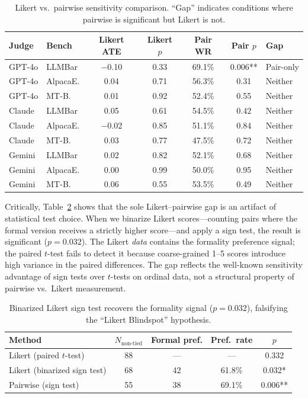 \documentclass[11pt,a4paper]{article}
\begin{document}
\begin{table}[t]
\centering
\small
\caption{Likert vs.\ pairwise sensitivity comparison. ``Gap'' indicates conditions where pairwise is significant but Likert is not.}
\label{tab:likert_pairwise}
\begin{tabular}{llccccl}
\toprule
\textbf{Judge} & \textbf{Bench} & \textbf{Likert ATE} & \textbf{Likert $p$} & \textbf{Pair WR} & \textbf{Pair $p$} & \textbf{Gap} \\
\midrule
GPT-4o & LLMBar & $-$0.10 & 0.33 & 69.1\% & 0.006** & Pair-only \\
GPT-4o & AlpacaE. & 0.04 & 0.71 & 56.3\% & 0.31 & Neither \\
GPT-4o & MT-B. & 0.01 & 0.92 & 52.4\% & 0.55 & Neither \\
Claude & LLMBar & 0.05 & 0.61 & 54.5\% & 0.42 & Neither \\
Claude & AlpacaE. & $-$0.02 & 0.85 & 51.1\% & 0.84 & Neither \\
Claude & MT-B. & 0.03 & 0.77 & 47.5\% & 0.72 & Neither \\
Gemini & LLMBar & 0.02 & 0.82 & 52.1\% & 0.68 & Neither \\
Gemini & AlpacaE. & 0.00 & 0.99 & 50.0\% & 0.95 & Neither \\
Gemini & MT-B. & 0.06 & 0.55 & 53.5\% & 0.49 & Neither \\
\bottomrule
\end{tabular}
\end{table}

Critically, Table~\ref{tab:binarized} shows that the sole Likert--pairwise gap is an artifact of statistical test choice. When we binarize Likert scores---counting pairs where the formal version receives a strictly higher score---and apply a sign test, the result is significant ($p=0.032$). The Likert \emph{data} contains the formality preference signal; the paired $t$-test fails to detect it because coarse-grained 1--5 scores introduce high variance in the paired differences. The gap reflects the well-known sensitivity advantage of sign tests over $t$-tests on ordinal data, not a structural property of pairwise vs.\ Likert measurement.

\begin{table}[t]
\centering
\small
\caption{Binarized Likert sign test recovers the formality signal ($p=0.032$), falsifying the ``Likert Blindspot'' hypothesis.}
\label{tab:binarized}
\begin{tabular}{lcccc}
\toprule
\textbf{Method} & \textbf{$N_{\text{non-tied}}$} & \textbf{Formal pref.} & \textbf{Pref.\ rate} & \textbf{$p$} \\
\midrule
Likert (paired $t$-test) & 88 & --- & --- & 0.332 \\
Likert (binarized sign test) & 68 & 42 & 61.8\% & 0.032* \\
Pairwise (sign test) & 55 & 38 & 69.1\% & 0.006** \\
\bottomrule
\end{tabular}
\end{table}
\end{document}
